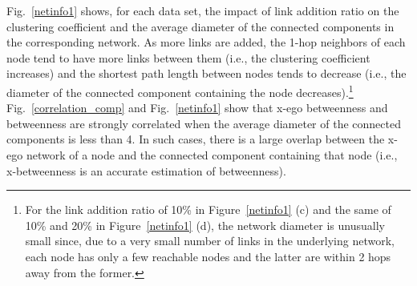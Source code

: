 
Fig.~\ref{netinfo1} shows, for each data set, the impact of link addition ratio on the clustering coefficient and the average diameter of the connected components in the corresponding network.
As more links are added, the 1-hop neighbors of each node tend to have more links between them (i.e., the clustering coefficient increases) and the shortest path length between nodes tends to decrease (i.e., the diameter of the connected component containing the node decreases).\footnote{For the link addition ratio of 10\% in Figure~\ref{netinfo1} (c) and the same of 10\% and 20\% in Figure~\ref{netinfo1} (d), the network diameter is unusually small since, due to a very small number of links in the underlying network, each node has only a few reachable nodes and the latter are within 2 hops away from the former.}
Fig.~\ref{correlation_comp} and Fig.~\ref{netinfo1} show that x-ego betweenness and betweenness are strongly correlated when the average diameter of the connected components is less than 4.
In such cases, there is a large overlap between the x-ego network of a node and the connected component containing that node (i.e., x-betweenness is an accurate estimation of betweenness).

